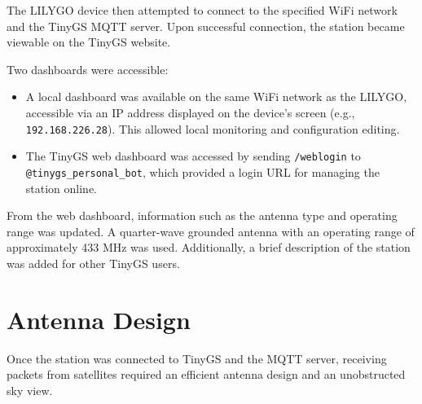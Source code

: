 \documentclass[12pt,a4paper]{article}
\begin{document}
The LILYGO device then attempted to connect to the specified WiFi network and the TinyGS MQTT server. Upon successful connection, the station became viewable on the TinyGS website.

Two dashboards were accessible:
\begin{itemize}
    \item A local dashboard was available on the same WiFi network as the LILYGO, accessible via an IP address displayed on the device's screen (e.g., \texttt{192.168.226.28}). This allowed local monitoring and configuration editing.
    \item The TinyGS web dashboard was accessed by sending \texttt{/weblogin} to \texttt{@tinygs\_personal\_bot}, which provided a login URL for managing the station online.
\end{itemize}

From the web dashboard, information such as the antenna type and operating range was updated. A quarter-wave grounded antenna with an operating range of approximately 433 MHz was used. Additionally, a brief description of the station was added for other TinyGS users.

\section{Antenna Design}
Once the station was connected to TinyGS and the MQTT server, receiving packets from satellites required an efficient antenna design and an unobstructed sky view.
\end{document}
